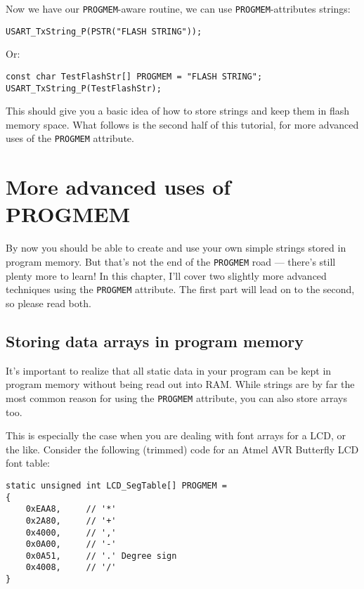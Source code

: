 \documentclass[a4paper,oneside,notitlepage]{book}
\begin{document}
Now we have our \lstinline{PROGMEM}-aware routine, we can use \lstinline{PROGMEM}-attributes strings:

\begin{center}
\begin{lstlisting}
USART_TxString_P(PSTR("FLASH STRING"));
\end{lstlisting}
\end{center}

Or:

\begin{center}
\begin{lstlisting}
const char TestFlashStr[] PROGMEM = "FLASH STRING";
USART_TxString_P(TestFlashStr);
\end{lstlisting}
\end{center}

This should give you a basic idea of how to store strings and keep them in flash memory space. What follows is the second half of this tutorial, for more advanced uses of the \lstinline{PROGMEM} attribute.


\chapter{More advanced uses of PROGMEM}
\label{chp:advprogmem}

By now you should be able to create and use your own simple strings stored in program memory. But that's not the end of the \lstinline{PROGMEM} road --- there's still plenty more to learn! In this chapter, I'll cover two slightly more advanced techniques using the \lstinline{PROGMEM} attribute. The first part will lead on to the second, so please read both.

\section{Storing data arrays in program memory}

It's important to realize that all static data in your program can be kept in program memory without being read out into RAM. While strings are by far the most common reason for using the \lstinline{PROGMEM} attribute, you can also store arrays too.

This is especially the case when you are dealing with font arrays for a LCD, or the like. Consider the following (trimmed) code for an Atmel AVR Butterfly LCD font table:

\begin{center}
\begin{lstlisting}
static unsigned int LCD_SegTable[] PROGMEM =
{
    0xEAA8,     // '*'
    0x2A80,     // '+'
    0x4000,     // ','
    0x0A00,     // '-'
    0x0A51,     // '.' Degree sign
    0x4008,     // '/'
}
\end{lstlisting}
\end{center}
\end{document}
